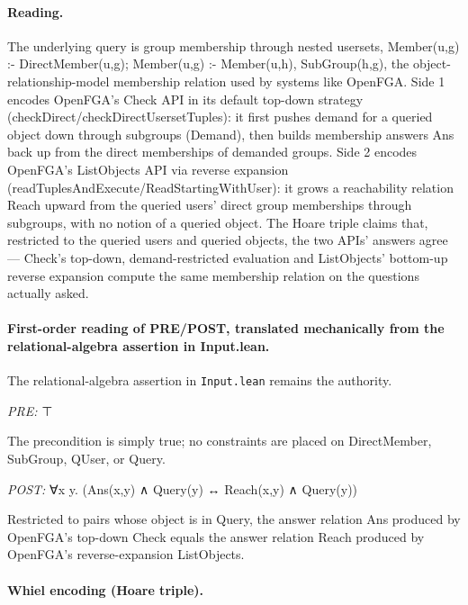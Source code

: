 \documentclass[10pt]{article}
\begin{document}
\paragraph{Reading.} The underlying query is group membership through nested usersets, Member(u,g) :- DirectMember(u,g); Member(u,g) :- Member(u,h), SubGroup(h,g), the object-relationship-model membership relation used by systems like OpenFGA. Side 1 encodes OpenFGA's Check API in its default top-down strategy (checkDirect/checkDirectUsersetTuples): it first pushes demand for a queried object down through subgroups (Demand), then builds membership answers Ans back up from the direct memberships of demanded groups. Side 2 encodes OpenFGA's ListObjects API via reverse expansion (readTuplesAndExecute/ReadStartingWithUser): it grows a reachability relation Reach upward from the queried users' direct group memberships through subgroups, with no notion of a queried object. The Hoare triple claims that, restricted to the queried users and queried objects, the two APIs' answers agree --- Check's top-down, demand-restricted evaluation and ListObjects' bottom-up reverse expansion compute the same membership relation on the questions actually asked.

\paragraph{First-order reading of PRE/POST, translated mechanically from the relational-algebra assertion in Input.lean.} The relational-algebra assertion in \texttt{Input.lean} remains the authority.

\textit{PRE:} ⊤\par The precondition is simply true; no constraints are placed on DirectMember, SubGroup, QUser, or Query.

\textit{POST:} ∀x y. (Ans(x,y) ∧ Query(y) ↔ Reach(x,y) ∧ Query(y))\par Restricted to pairs whose object is in Query, the answer relation Ans produced by OpenFGA's top-down Check equals the answer relation Reach produced by OpenFGA's reverse-expansion ListObjects.

\paragraph{Whiel encoding (Hoare triple).}
\end{document}
